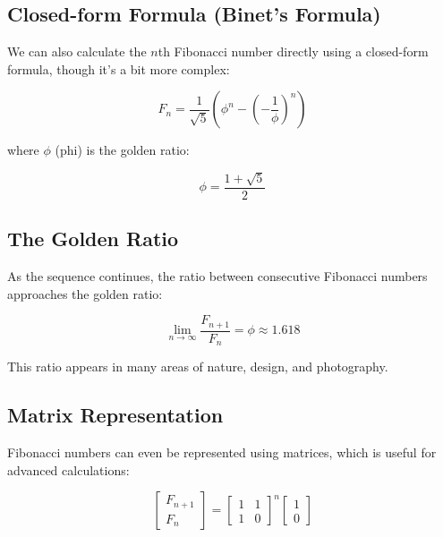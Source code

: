 \documentclass{article} %
\begin{document}
\subsection{Closed-form Formula (Binet's Formula)}

We can also calculate the $n$th Fibonacci number directly using a closed-form formula, though it's a bit more complex:

\begin{equation}
F_n = \frac{1}{\sqrt{5}} \left( \phi^n - \left( -\frac{1}{\phi} \right)^n \right)
\end{equation}

where $\phi$ (phi) is the golden ratio:

\begin{equation}
\phi = \frac{1 + \sqrt{5}}{2}
\end{equation}

\subsection{The Golden Ratio}

As the sequence continues, the ratio between consecutive Fibonacci numbers approaches the golden ratio:

\begin{equation}
\lim_{n \to \infty} \frac{F_{n+1}}{F_n} = \phi \approx 1.618
\end{equation}

This ratio appears in many areas of nature, design, and photography.

\subsection{Matrix Representation}

Fibonacci numbers can even be represented using matrices, which is useful for advanced calculations:

\begin{equation}
\begin{bmatrix}
F_{n+1} \\
F_n
\end{bmatrix}
=
\begin{bmatrix}
1 & 1 \\
1 & 0
\end{bmatrix}^n
\begin{bmatrix}
1 \\
0
\end{bmatrix}
\end{equation}
\end{document}
